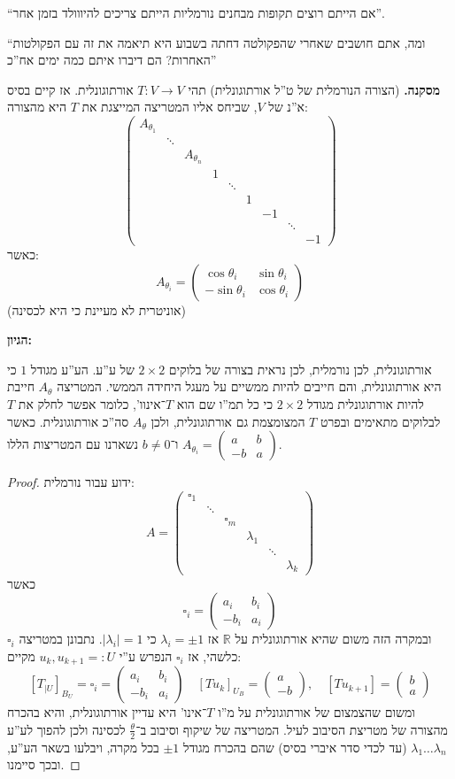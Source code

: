 \documentclass[]{article}
\newcommand\R     {\mathbb{R}}
\newcommand\ta    {\theta}
\newcommand\co        {\colon}
\newcommand\pms[1]    {\begin{pmatrix}
		#1
\end{pmatrix}}
\renewcommand\lg      {\lambda}
\theoremstyle{definition}
\begin{document}
	``אם הייתם רוצים תקופות מבחנים נורמליות הייתם צריכים להיווולד בזמן אחר''. 
	
	``ומה, אתם חושבים שאחרי שהפקולטה דחתה בשבוע היא תיאמה את זה עם הפקולטות האחרות? הם דיברו איתם כמה ימים אח''כ''
	
	\textbf{מסקנה. }(הצורה הנורמלית של ט''ל אורתוגונלית) תהי $T \co V \to V$ אורתוגונלית. אז קיים בסיס א''נ של $V$, שביחס אליו המטריצה המייצגת את $T$ היא מהצורה: 
	\[ \pms{A_{\ta_1} \\ &\ddots \\ &&A_{\ta_n} \\ &&& 1 \\ &&&&\ddots \\ &&&&&1 \\ &&&&&&-1 \\ &&&&&&& \ddots \\ &&&&&&&&-1} \]
	כאשר: 
	\[ A_{\ta_i} = \pms{\cos \ta_i & \sin \ta_i \\ -\sin \ta_i & \cos \ta_i} \]
	(אוניטרית לא מעיינת כי היא לכסינה)
	
	\textbf{הגיון: }
	
		אורתוגונלית, לכן נורמלית, לכן נראית בצורה של בלוקים $2 \times 2$ של ע''ע. הע''ע מגודל $1$ כי היא אורתוגונלית, והם חייבים להיות ממשיים על מעגל היחידה הממשי. המטריצה $A_{\ta}$ חייבת להיות אורתוגונלית מגודל $2 \times 2$ כי כל תמ''ו שם הוא $T$־אינוו', כלומר אפשר לחלק את $T$ לבלוקים מתאימים ובפרט $T$ המצומצמת גם אורתוגונלית, ולכן $A_{\ta}$ סה''כ אורתוגונלית. כאשר $A_{\ta_i} = \pms{a & b \\ -b & a}$ ו־$b \neq 0$ נשארנו עם המטריצות הללו. 
	
	
	\begin{proof}
		ידוע עבור נורמלית: 
		\[ A = \pms{\square_1 \\ & \ddots \\ &&\square_m \\ &&& \lg_1 \\ &&&&\ddots \\ &&&&&\lg_k} \]
		כאשר
		\[ \square_i = \pms{a_i & b_i \\ -b_i & a_i} \]
		ובמקרה הזה משום שהיא אורתוגונלית על $\R$ אז $\lg_i = \pm1$ כי $|\lg_i| = 1$. נתבונן במטריצה $\square_i$ כלשהי, אז $\square_i$ הנפרש ע''י $u_k, u_{k + 1} =: U$ מקיים: 
		\[ [T_{|U}]_{B_U} = \square_i = \pms{a_i & b_i \\ -b_i & a_i}\quad [Tu_k]_{U_B} = \pms{a \\ -b}, \quad [Tu_{k + 1}] = \pms{b \\ a} \]
		ומשום שהצמצום של אורתוגונלית על מ''ו $T$־אינו' היא עדיין אורתוגונלית, והיא בהכרח מהצורה של מטריצת הסיבוב לעיל. המטריצה של שיקוף וסיבוב ב־$\frac{\ta}{2}$ לכסינה ולכן להפוך לע''ע $\lg_1 \dots \lg_n$ (עד לכדי סדר איברי בסיס) שהם בהכרח מגודל $\pm 1$ בכל מקרה, ויבלעו בשאר הע''ע, ובכך סיימנו. 
	\end{proof}
	
\end{document}
